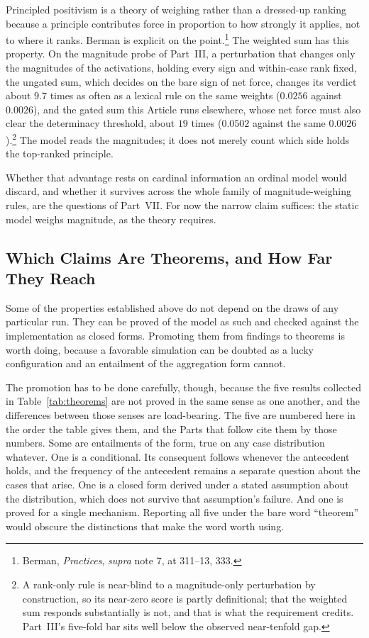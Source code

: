 Principled positivism is a theory of weighing rather than a dressed-up
ranking because a principle contributes force in proportion to how
strongly it applies, not to where it ranks. Berman is explicit on the point.\footnote{Berman, \textit{Practices}, \textit{supra} note 7, at
311--13, 333.} The weighted sum has this property. On the magnitude probe of Part~III, a
perturbation that changes only the magnitudes of the activations, holding
every sign and within-case rank fixed, the ungated sum, which decides on the
bare sign of net force, changes its verdict about $9.7$ times
as often as a lexical rule on the same weights ($0.0256$ against $0.0026$),
and the gated sum this Article runs elsewhere, whose net force must also clear
the determinacy threshold, about $19$ times ($0.0502$
against the same $0.0026$).\footnote{A rank-only rule is near-blind to a magnitude-only
perturbation by construction, so its near-zero score is partly definitional;
that the weighted sum responds substantially is not, and that is what the
requirement credits. Part~III's five-fold bar sits well below the observed
near-tenfold gap.} The model reads the magnitudes; it does not merely count
which side holds the top-ranked principle.

Whether that advantage rests on cardinal information an ordinal model would
discard, and whether it survives across the whole family of magnitude-weighing
rules, are the questions of Part~VII. For now the narrow claim suffices: the
static model weighs magnitude, as the theory requires.

\subsection{Which Claims Are Theorems, and How Far They Reach}

Some of the properties established above do not depend on the draws of any
particular run. They can be proved of the model as such and checked against
the implementation as closed forms. Promoting them from findings to theorems is worth doing, because a
favorable simulation can be doubted as a lucky configuration and an entailment
of the aggregation form cannot.

The promotion has to be done carefully, though, because the five results
collected in Table~\ref{tab:theorems} are not proved in the same sense as one
another, and the differences between those senses are load-bearing. The five
are numbered here in the order the table gives them, and the Parts that follow
cite them by those numbers. Some are entailments
of the form, true on any case distribution whatever. One is a conditional.
Its consequent follows whenever the antecedent holds, and the frequency of
the antecedent remains a separate question about the cases that arise. One
is a closed form derived under a stated assumption about the distribution,
which does not survive that assumption's failure. And one is proved for a
single mechanism. Reporting all five under the bare word ``theorem'' would
obscure the distinctions that make the word worth using.

